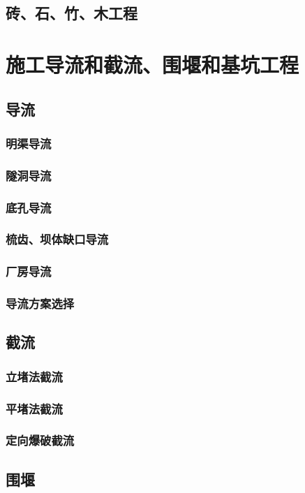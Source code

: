 \documentclass[UTF8]{../../ApplicationUniverse}
\begin{document}
    \subsection{砖、石、竹、木工程}
\section{施工导流和截流、围堰和基坑工程}
    \subsection{导流}
        \subsubsection{明渠导流}
        \subsubsection{隧洞导流}
        \subsubsection{底孔导流}
        \subsubsection{梳齿、坝体缺口导流}
        \subsubsection{厂房导流}
        \subsubsection{导流方案选择}
    \subsection{截流}
        \subsubsection{立堵法截流}
        \subsubsection{平堵法截流}
        \subsubsection{定向爆破截流}
    \subsection{围堰}
\end{document}
